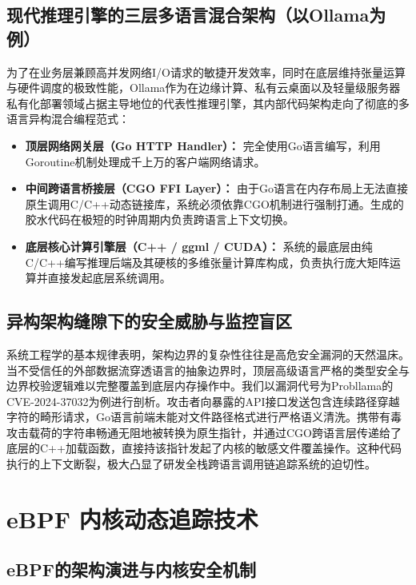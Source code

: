 \subsection{现代推理引擎的三层多语言混合架构（以Ollama为例）}

为了在业务层兼顾高并发网络I/O请求的敏捷开发效率，同时在底层维持张量运算与硬件调度的极致性能，Ollama作为在边缘计算、私有云桌面以及轻量级服务器私有化部署领域占据主导地位的代表性推理引擎，其内部代码架构走向了彻底的多语言异构混合编程范式：

\begin{itemize}
    \item \textbf{顶层网络网关层（Go HTTP Handler）：} 完全使用Go语言编写，利用Goroutine机制处理成千上万的客户端网络请求。

    \item \textbf{中间跨语言桥接层（CGO FFI Layer）：} 由于Go语言在内存布局上无法直接原生调用C/C++动态链接库，系统必须依靠CGO机制进行强制打通。生成的胶水代码在极短的时钟周期内负责跨语言上下文切换。

    \item \textbf{底层核心计算引擎层（C++ / ggml / CUDA）：} 系统的最底层由纯C/C++编写推理后端及其硬核的多维张量计算库构成，负责执行庞大矩阵运算并直接发起底层系统调用。
\end{itemize}

\subsection{异构架构缝隙下的安全威胁与监控盲区}

系统工程学的基本规律表明，架构边界的复杂性往往是高危安全漏洞的天然温床。当不受信任的外部数据流穿透语言的抽象边界时，顶层高级语言严格的类型安全与边界校验逻辑难以完整覆盖到底层内存操作中。我们以漏洞代号为Probllama的CVE-2024-37032为例进行剖析。攻击者向暴露的API接口发送包含连续路径穿越字符的畸形请求，Go语言前端未能对文件路径格式进行严格语义清洗。携带有毒攻击载荷的字符串畅通无阻地被转换为原生指针，并通过CGO跨语言层传递给了底层的C++加载函数，直接持该指针发起了内核的敏感文件覆盖操作。这种代码执行的上下文断裂，极大凸显了研发全栈跨语言调用链追踪系统的迫切性。

\section{eBPF 内核动态追踪技术}

\subsection{eBPF的架构演进与内核安全机制}

